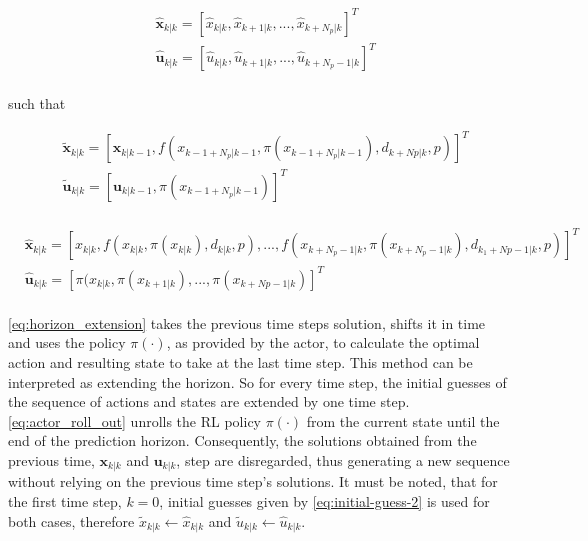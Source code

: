\begin{equation}\label{eq:initial-guess-2}
	\begin{aligned}
		&\hat{\mathbf{x}}_{k|k} = [\hat{x}_{k|k},\hat{x}_{k+1|k},...,\hat{x}_{k + N_p|k}]^T \\ 
		&\hat{\mathbf{u}}_{k|k} = [\hat{u}_{k|k},\hat{u}_{k + 1|k},...,\hat{u}_{k + N_p - 1|k}]^T\\ 
	\end{aligned}
\end{equation}

such that

 \begin{equation}\label{eq:horizon_extension}
 	\begin{aligned}
 		&\tilde{\mathbf{x}}_{k|k} = [\mathbf{x}_{k|k-1},f(x_{k-1 + N_p|k-1}, \pi(x_{k-1 + N_p|k-1}), d_{k+Np|k},p)]^T\\ 
 		&\tilde{\mathbf{u}}_{k|k} = [\mathbf{u}_{k|k-1},\pi(x_{k-1 + N_p|k-1})]^T\\
 	\end{aligned}
 \end{equation}

\begin{equation}\label{eq:actor_roll_out}
	\begin{aligned}
		&\hat{\mathbf{x}}_{k|k} = [x_{k|k},f(x_{k|k},\pi(x_{k|k}),d_{k|k},p),..., f(x_{k+N_p-1|k}, \pi(x_{k + N_p-1|k}), d_{k_1 + Np-1|k},p)]^T \\ 
		&\hat{\mathbf{u}}_{k|k} = [\pi(x_{k|k},\pi(x_{k+1|k}),...,\pi(x_{k+Np-1|k})]^T \\ 
	\end{aligned}
	\end{equation}

\autoref{eq:horizon_extension} takes the previous time steps solution, shifts it in time and uses the policy $\pi(\cdot)$, as provided by the actor, to calculate the optimal action and resulting state to take at the last time step. This method can be interpreted as extending the horizon. So for every time step, the initial guesses of the sequence of actions and states are extended by one time step. \autoref{eq:actor_roll_out} unrolls the RL policy $\pi(\cdot)$ from the current state until the end of the prediction horizon. Consequently, the  solutions obtained from the previous time, $\mathbf{x}_{k|k}$ and $\mathbf{u}_{k|k}$, step are disregarded, thus generating a new sequence without relying on the previous time step's solutions. It must be noted, that for the first time step, $k=0$, initial guesses given by \autoref{eq:initial-guess-2} is used for both cases, therefore $\tilde{x}_{k|k} \leftarrow \hat{x}_{k|k}$ and $\tilde{u}_{k|k} \leftarrow \hat{u}_{k|k}$.

